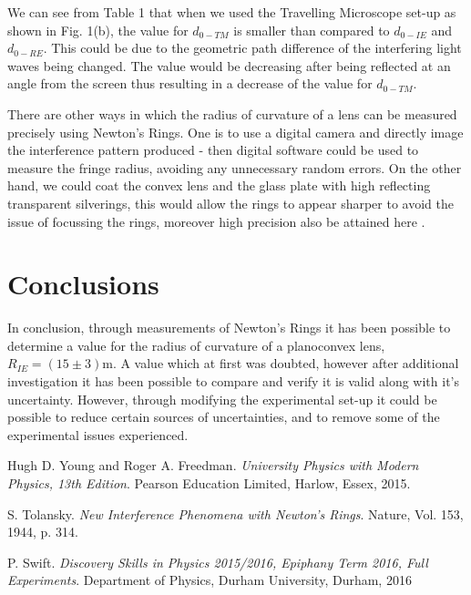 \documentclass[twocolumn]{revtex4}
\begin{document}
We can see from Table 1 that when we used the Travelling Microscope set-up as shown in Fig. 1(b), the value for $d_{0-TM}$ is smaller than compared to $d_{0-IE}$ and $d_{0-RE}$. This could be due to the geometric path difference of the interfering light waves being changed. The value would be decreasing after being reflected at an angle from the screen thus resulting in a decrease of the value for $d_{0-TM}$. 

There are other ways in which the radius of curvature of a lens can be measured precisely using Newton's Rings. One is to use a digital camera and directly image the interference pattern produced - then digital software could be used to measure the fringe radius, avoiding any unnecessary random errors. On the other hand, we could coat the convex lens and the glass plate with high reflecting transparent silverings, this would allow the rings to appear sharper to avoid the issue of focussing the rings, moreover high precision also be attained here \cite{manchester}.

\vspace{-5ex}
\section{Conclusions}
\vspace{-2ex}
 
In conclusion, through measurements of Newton's Rings it has been possible to determine a value for the radius of curvature of a planoconvex lens, $R_{IE}=(15\pm3)$m. A value which at first was doubted, however after additional investigation it has been possible to compare and verify it is valid along with it's uncertainty. However, through modifying the experimental set-up it could be possible to reduce certain sources of uncertainties, and to remove some of the experimental issues experienced.

\begin{thebibliography}{5}
	Hugh D. Young and Roger A. Freedman.
	\textit{University Physics with Modern Physics, 13th Edition}. 
	Pearson Education Limited, Harlow, Essex, 2015.
	
	S. Tolansky.
	\textit{New Interference Phenomena with Newton's Rings}.
	Nature, Vol. 153, 1944, p. 314.

	P. Swift.
	\textit{Discovery Skills in Physics 2015/2016, Epiphany Term 2016, Full Experiments}.
	Department of Physics, Durham University, Durham, 2016
	
\end{thebibliography}
\clearpage
\end{document}
